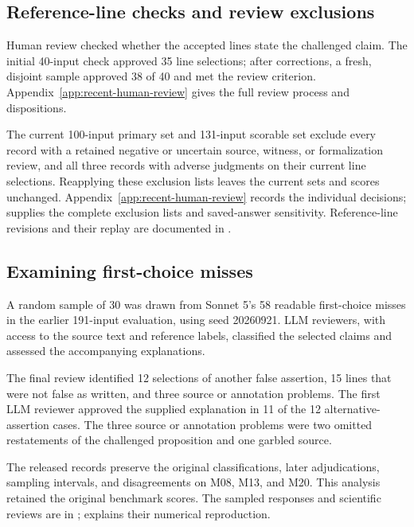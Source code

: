 \subsection{Reference-line checks and review exclusions}
\label{app:ccl_detailed_sensitivities}

Human review checked whether the accepted lines state the challenged claim. The initial 40-input check approved 35 line selections; after corrections, a fresh, disjoint sample approved 38 of 40 and met the review criterion. Appendix~\ref{app:recent-human-review} gives the full review process and dispositions.

The current 100-input primary set and 131-input scorable set exclude every record with a retained negative or uncertain source, witness, or formalization review, and all three records with adverse judgments on their current line selections. Reapplying these exclusion lists leaves the current sets and scores unchanged. Appendix~\ref{app:recent-human-review} records the individual decisions;  supplies the complete exclusion lists and saved-answer sensitivity. Reference-line revisions and their replay are documented in .

\subsection{Examining first-choice misses}
\label{app:ccl_miss_diagnostic}

A random sample of 30 was drawn from Sonnet 5's 58 readable first-choice misses in the earlier 191-input evaluation, using seed 20260921. LLM reviewers, with access to the source text and reference labels, classified the selected claims and assessed the accompanying explanations.

The final review identified 12 selections of another false assertion, 15 lines that were not false as written, and three source or annotation problems. The first LLM reviewer approved the supplied explanation in 11 of the 12 alternative-assertion cases. The three source or annotation problems were two omitted restatements of the challenged proposition and one garbled source.

The released records preserve the original classifications, later adjudications, sampling intervals, and disagreements on M08, M13, and M20. This analysis retained the original benchmark scores. The sampled responses and scientific reviews are in ;  explains their numerical reproduction.

